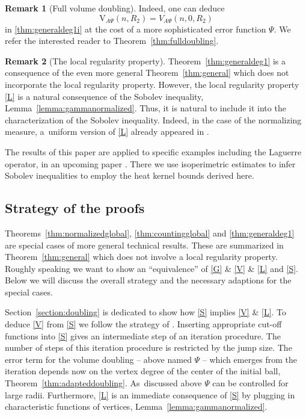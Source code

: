 \documentclass[10pt]{amsart}
\newcommand{\rV}{\mathrm{V}}
\theoremstyle{plain}
\theoremstyle{definition}
\newtheorem*{remark}{Remark}
\begin{document}
{\begin{remark}[Full volume doubling]
Indeed, one can deduce
\[
\rV_{\!A\Psi}(n,R_2)=V_{A\Psi}(n,0,R_2)
\]
in \eqref{thm:generaldeg1i} at the cost of a more sophisticated error function $\Psi$. We refer the interested reader to Theorem~\ref{thm:fulldoubling}.
\end{remark}}

\begin{remark}[The local regularity property] Theorem~\ref{thm:generaldeg1} is a consequence of the even more general Theorem~\ref{thm:general} which does not incorporate the local regularity property. However, the local regularity property \eqref{L} is a natural consequence of the Sobolev inequality, \cf Lemma~\ref{lemma:gammanormalized}. Thus, it is natural to include it into the characterization of the Sobolev inequality. Indeed, {in the case of the normalizing measure}, a~uniform version of \eqref{L} already appeared in \cite{BarlowChen-16}.
\end{remark}

The results of this paper are applied to specific examples including the Laguerre operator, \cf \cite{Kostenko-21} in an upcoming paper \cite{KellerKNR-24}. There we use isoperimetric estimates to infer Sobolev inequalities to employ the heat kernel bounds derived here.

\subsection{Strategy of the proofs}\label{sec:strategy}

Theorems~\ref{thm:normalizedglobal}, \ref{thm:countingglobal} and \ref{thm:generaldeg1} are special cases of more general technical results. These are summarized in Theorem~\ref{thm:general} which does not involve a local regularity property. Roughly speaking we want to show an ``equivalence'' of \eqref{G} \& \eqref{V} \& \eqref{L}
and \eqref{S}. Below we will discuss the overall strategy and the necessary adaptions for the special cases.

Section~\ref{section:doubling} is dedicated to show how \eqref{S} implies \eqref{V} \& \eqref{L}. To deduce \eqref{V} from \eqref{S} we follow the strategy of \cite{SaloffC-01}. Inserting appropriate cut-off functions into \eqref{S} gives an intermediate step of an iteration procedure. The number of steps of this iteration procedure is restricted by the jump size. The error term for the volume doubling -- above named $ {\Psi} $ -- which emerges from the iteration depends now on {the vertex degree of the center of} the initial ball, \cf Theorem~\ref{thm:adapteddoubling}. As~discussed above $\Psi $ can be controlled for large radii. Furthermore, \eqref{L} is an immediate consequence of \eqref{S} by plugging in characteristic functions of vertices, \cf Lemma~\ref{lemma:gammanormalized}.
\end{document}

